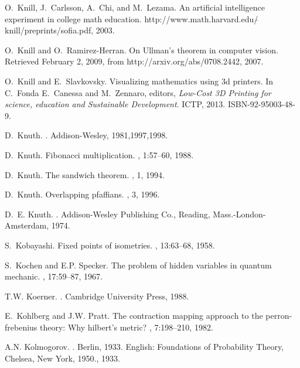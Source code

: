 \documentclass[12pt]{amsart}
\begin{document}
\begin{thebibliography}{100}
O.~Knill, J.~Carlsson, A.~Chi, and M.~Lezama.
\newblock An artificial intelligence experiment in college math education.
\newblock http://www.math.harvard.edu/$\tilde{}$knill/preprints/sofia.pdf,
  2003.

O.~Knill and O.~Ramirez-Herran.
\newblock On {U}llman's theorem in computer vision.
\newblock Retrieved February 2, 2009, from http://arxiv.org/abs/0708.2442,
  2007.

O.~Knill and E.~Slavkovsky.
\newblock Visualizing mathematics using 3d printers.
\newblock In C.~Fonda E.~Canessa and M.~Zennaro, editors, {\em Low-Cost 3D
  Printing for science, education and Sustainable Development}. ICTP, 2013.
\newblock ISBN-92-95003-48-9.

D.~Knuth.
.
\newblock Addison-Wesley, 1981,1997,1998.

D.~Knuth.
\newblock Fibonacci multiplication.
, 1:57--60, 1988.

D.~Knuth.
\newblock The sandwich theorem.
, 1, 1994.

D.~Knuth.
\newblock Overlapping pfaffians.
, 3, 1996.

D.~E. Knuth.
.
\newblock Addison-Wesley Publishing Co., Reading, Mass.-London-Amsterdam, 1974.

S.~Kobayashi.
\newblock Fixed points of isometries.
, 13:63--68, 1958.

S.~Kochen and E.P. Specker.
\newblock The problem of hidden variables in quantum mechanic.
, 17:59--87, 1967.

T.W. Koerner.
.
\newblock Cambridge University Press, 1988.

E.~Kohlberg and J.W. Pratt.
\newblock The contraction mapping approach to the perron-frebenius theory: Why
  hilbert's metric?
, 7:198--210, 1982.

A.N. Kolmogorov.
.
\newblock Berlin, 1933. English: Foundations of Probability Theory, Chelsea,
  New York, 1950., 1933.


\end{thebibliography}
\end{document}
